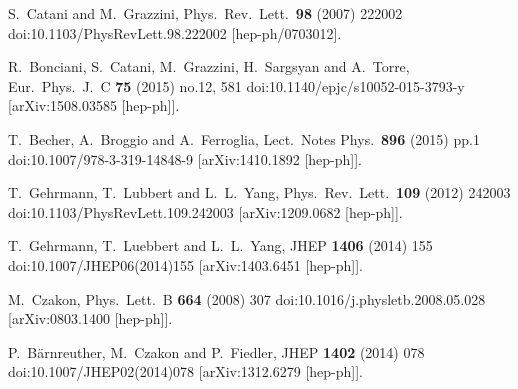 \documentclass{PoS}
\begin{document}
\begin{thebibliography}{99}
  S.~Catani and M.~Grazzini,
  Phys.\ Rev.\ Lett.\  {\bf 98} (2007) 222002
  doi:10.1103/PhysRevLett.98.222002
  [hep-ph/0703012].

  R.~Bonciani, S.~Catani, M.~Grazzini, H.~Sargsyan and A.~Torre,
  Eur.\ Phys.\ J.\ C {\bf 75} (2015) no.12,  581
  doi:10.1140/epjc/s10052-015-3793-y
  [arXiv:1508.03585 [hep-ph]].

  T.~Becher, A.~Broggio and A.~Ferroglia,
  Lect.\ Notes Phys.\  {\bf 896} (2015) pp.1
  doi:10.1007/978-3-319-14848-9
  [arXiv:1410.1892 [hep-ph]].

  T.~Gehrmann, T.~Lubbert and L.~L.~Yang,
  Phys.\ Rev.\ Lett.\  {\bf 109} (2012) 242003
  doi:10.1103/PhysRevLett.109.242003
  [arXiv:1209.0682 [hep-ph]].

  T.~Gehrmann, T.~Luebbert and L.~L.~Yang,
  JHEP {\bf 1406} (2014) 155
  doi:10.1007/JHEP06(2014)155
  [arXiv:1403.6451 [hep-ph]].

  M.~Czakon,
  Phys.\ Lett.\ B {\bf 664} (2008) 307
  doi:10.1016/j.physletb.2008.05.028
  [arXiv:0803.1400 [hep-ph]].

  P.~B\"arnreuther, M.~Czakon and P.~Fiedler,
  JHEP {\bf 1402} (2014) 078
  doi:10.1007/JHEP02(2014)078
  [arXiv:1312.6279 [hep-ph]].


\end{thebibliography}
\end{document}
